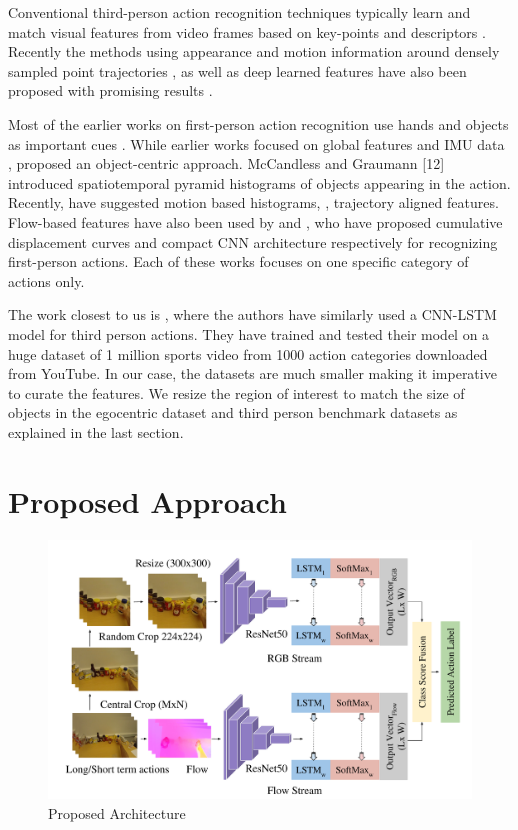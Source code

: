 \documentclass{article}
\begin{document}
Conventional third-person action recognition techniques typically learn and match visual features from video frames based on key-points and descriptors \cite{ Willems2008, Lior2009}. Recently the methods using appearance and motion information around densely sampled point trajectories \cite{wang2013action, mihir_cvpr13, kraft2014accv}, as well as deep learned features have also been proposed with promising results \cite{karpathy2014action,   tran_c3d, twostream2014action}.

Most of the earlier works on first-person action recognition use hands and objects as important cues \cite{  fathi2011learning, pirsiavash2012detecting, ryoo2013first}. While earlier works focused on global features and IMU data \cite{spriggs2009temporal}, \cite{pirsiavash2012detecting} proposed an object-centric approach. McCandless and Graumann [12] introduced spatiotemporal pyramid histograms of objects appearing in the action. Recently, \cite{kitani2011fast} have suggested motion based histograms, \cite{suriya2016trajfeatures}, trajectory aligned features. Flow-based features have also been used by \cite{poleg2014temporal} and \cite{poleg2016compact}, who have proposed cumulative displacement curves and compact CNN architecture respectively for recognizing first-person actions. Each of these works focuses on one specific category of actions only.

The work closest to us is \cite{videoclass2015ng}, where the authors have similarly used a CNN-LSTM model for third person actions. They have trained and tested their model on a huge dataset of 1 million sports video from 1000 action categories downloaded from YouTube. In our case, the datasets are much smaller making it imperative to curate the features. We resize the region of interest to match the size of objects in the egocentric dataset and third person benchmark datasets as explained in the last section.

\section{Proposed Approach}

\begin{figure}[t]
\includegraphics[width=1.0\linewidth]{ego_fusion}
\caption{Proposed Architecture}
\label{fig:res}
\end{figure}
\end{document}
